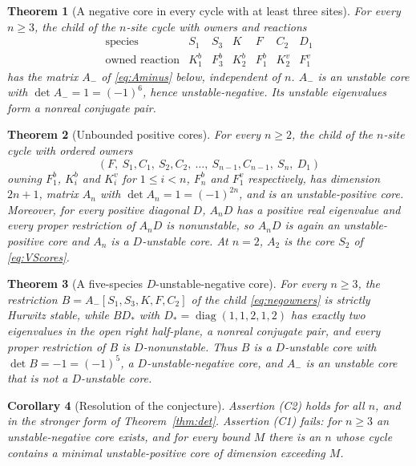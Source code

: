 \documentclass[11pt,a4paper]{article}
\theoremstyle{plain}
\newtheorem{theorem}{Theorem}[section]
\newtheorem{corollary}[theorem]{Corollary}
\theoremstyle{definition}
\theoremstyle{remark}
\newcommand{\Aminus}{A_{-}}
\DeclareMathOperator{\diag}{diag}
\begin{document}
\begin{theorem}[A negative core in every cycle with at least three sites]\label{thm:negative}
For every $n\ge3$, the child of the $n$-site cycle with owners and reactions
\begin{equation}\label{eq:negowners}
\begin{array}{c|cccccc}
\text{species}&S_1&S_3&K&F&C_2&D_1\\
\text{owned reaction}&K_1^b&F_3^b&K_2^b&F_1^b&K_2^v&F_1^v
\end{array}
\end{equation}
has the matrix $\Aminus$ of \eqref{eq:Aminus} below, independent of $n$. $\Aminus$ is an unstable core with $\det\Aminus=1=(-1)^6$, hence unstable-negative. Its unstable eigenvalues form a nonreal conjugate pair.
\end{theorem}

\begin{theorem}[Unbounded positive cores]\label{thm:positive}
For every $n\ge2$, the child of the $n$-site cycle with ordered owners
\begin{equation}\label{eq:posorder}
(F,\ S_1,C_1,\ S_2,C_2,\ \dots,\ S_{n-1},C_{n-1},\ S_n,\ D_1)
\end{equation}
owning $F_1^b$, $K_i^b$ and $K_i^v$ for $1\le i<n$, $F_n^b$ and $F_1^v$ respectively, has dimension $2n+1$, matrix $A_n$ with $\det A_n=1=(-1)^{2n}$, and is an unstable-positive core. Moreover, for every positive diagonal $D$, $A_nD$ has a positive real eigenvalue and every proper restriction of $A_nD$ is nonunstable, so $A_nD$ is again an unstable-positive core and $A_n$ is a $D$-unstable core. At $n=2$, $A_2$ is the core $S_2$ of \eqref{eq:VScores}.
\end{theorem}

\begin{theorem}[A five-species $D$-unstable-negative core]\label{thm:five}
For every $n\ge3$, the restriction $B=\Aminus[S_1,S_3,K,F,C_2]$ of the child \eqref{eq:negowners} is strictly Hurwitz stable, while $BD_*$ with $D_*=\diag(1,1,2,1,2)$ has exactly two eigenvalues in the open right half-plane, a nonreal conjugate pair, and every proper restriction of $B$ is $D$-nonunstable. Thus $B$ is a $D$-unstable core with $\det B=-1=(-1)^5$, a $D$-unstable-negative core, and $\Aminus$ is an unstable core that is not a $D$-unstable core.
\end{theorem}

\begin{corollary}[Resolution of the conjecture]\label{cor:resolution}
Assertion \textup{(C2)} holds for all $n$, and in the stronger form of Theorem~\ref{thm:det}. Assertion \textup{(C1)} fails: for $n\ge3$ an unstable-negative core exists, and for every bound $M$ there is an $n$ whose cycle contains a minimal unstable-positive core of dimension exceeding $M$.
\end{corollary}
\end{document}
